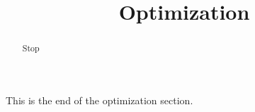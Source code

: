 \documentclass[handout]{ximera}
\title{Optimization}
\begin{document}
\begin{abstract} Stop
\end{abstract}

\maketitle

This is the end of the optimization section.
\end{document}
